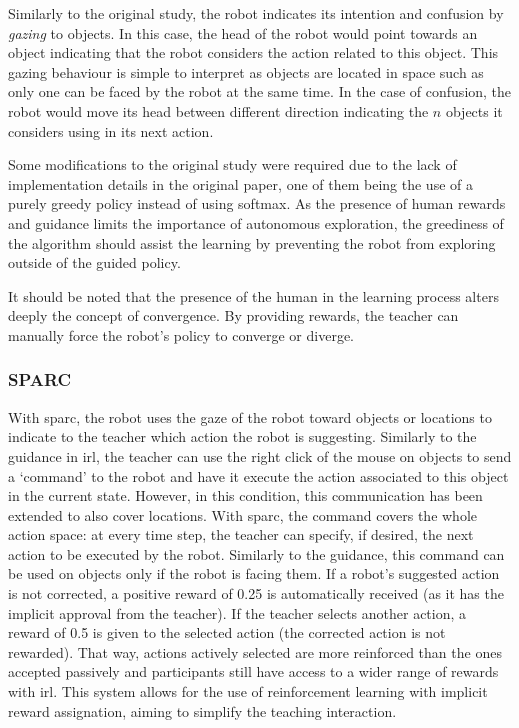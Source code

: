 Similarly to the original study, the robot indicates its intention and confusion by \emph{gazing} to objects. In this case, the head of the robot would point towards an object indicating that the robot considers the action related to this object. This gazing behaviour is simple to interpret as objects are located in space such as only one can be faced by the robot at the same time. In the case of confusion, the robot would move its head between different direction indicating the $n$ objects it considers using in its next action.

Some modifications to the original study were required due to the lack of implementation details in the original paper, one of them being the use of a purely greedy policy instead of using softmax. As the presence of human rewards and guidance limits the importance of autonomous exploration, the greediness of the algorithm should assist the learning by preventing the robot from exploring outside of the guided policy. 

It should be noted that the presence of the human in the learning process alters deeply the concept of convergence. By providing rewards, the teacher can manually force the robot's policy to converge or diverge.

\subsubsection{SPARC}

With \gls{sparc}, the robot uses the gaze of the robot toward objects or locations to indicate to the teacher which action the robot is suggesting. Similarly to the guidance in \gls{irl}, the teacher can use the right click of the mouse on objects to send a `command' to the robot and have it execute the action associated to this object in the current state. However, in this condition, this communication has been extended to also cover locations. With \gls{sparc}, the command covers the whole action space: at every time step, the teacher can specify, if desired, the next action to be executed by the robot. Similarly to the guidance, this command can be used on objects only if the robot is facing them. If a robot's suggested action is not corrected, a positive reward of 0.25 is automatically received (as it has the implicit approval from the teacher). If the teacher selects another action, a reward of 0.5 is given to the selected action (the corrected action is not rewarded). That way, actions actively selected are more reinforced than the ones accepted passively and participants still have access to a wider range of rewards with \gls{irl}. This system allows for the use of reinforcement learning with implicit reward assignation, aiming to simplify the teaching interaction.

